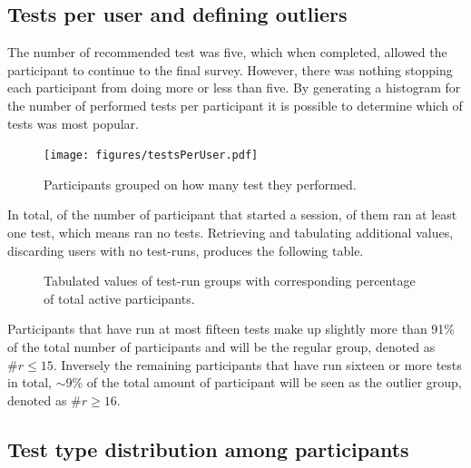 \documentclass[nofilelist,dvipsnames]{cslthse-msc}
\begin{document}
			\subsection{Tests per user and defining outliers}

				The number of recommended test was five, which when completed, allowed
				the participant to continue to the final survey. However, there was
				nothing stopping each participant from doing more or less than five.
        By generating a histogram for the number of performed tests per
        participant it is possible to determine which of tests was most
        popular.

				\begin{figure}[h!]
					\centering
					\texttt{[image: figures/testsPerUser.pdf]}
					\caption{Participants grouped on how many test they performed.}
				\end{figure}

        In total, of the  number of participant that
        started a session,  of them ran at least one
        test, which means  ran no tests. Retrieving and
        tabulating additional values, discarding users with no test-runs,
        produces the following table.

        \begin{figure}[h!]
          \centering
          \caption{
            Tabulated values of test-run groups with corresponding percentage
            of total active participants.
          }
        \end{figure}

        Participants that have run at most fifteen tests make up slightly more
        than 91\% of the total number of participants and will be the regular
        group, denoted as $\#r\leq15$. Inversely the remaining participants
        that have run sixteen or more tests in total, $\sim$9\% of the total
        amount of participant will be seen as the outlier group, denoted as
        $\#r\geq16$.

      \subsection{Test type distribution among participants}
\end{document}

